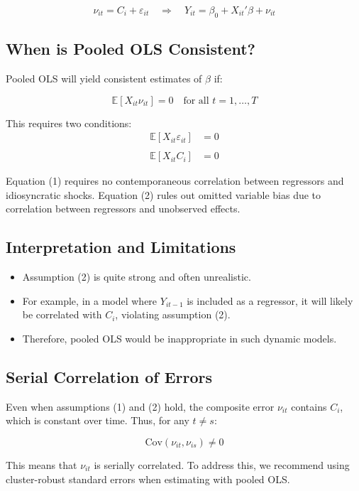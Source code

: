\documentclass[12pt, oneside]{article}
\begin{document}
\[
\nu_{it} = C_i + \varepsilon_{it}
\quad \Rightarrow \quad
Y_{it} = \beta_0 + X_{it}'\beta + \nu_{it}
\]

\subsection*{When is Pooled OLS Consistent?}

Pooled OLS will yield consistent estimates of \( \beta \) if:

\[
\mathbb{E}[X_{it} \nu_{it}] = 0 \quad \text{for all } t = 1, \dots, T
\]

This requires two conditions:
\begin{align}
\mathbb{E}[X_{it} \varepsilon_{it}] &= 0 \tag{1} \\\\
\mathbb{E}[X_{it} C_i] &= 0 \tag{2}
\end{align}

\noindent
Equation (1) requires no contemporaneous correlation between regressors and idiosyncratic shocks. Equation (2) rules out omitted variable bias due to correlation between regressors and unobserved effects.

\subsection*{Interpretation and Limitations}

\begin{itemize}
    \item Assumption (2) is quite strong and often unrealistic.
    \item For example, in a model where \( Y_{it-1} \) is included as a regressor, it will likely be correlated with \( C_i \), violating assumption (2).
    \item Therefore, pooled OLS would be inappropriate in such dynamic models.
\end{itemize}

\subsection*{Serial Correlation of Errors}

Even when assumptions (1) and (2) hold, the composite error \( \nu_{it} \) contains \( C_i \), which is constant over time. Thus, for any \( t \neq s \):

\[
\text{Cov}(\nu_{it}, \nu_{is}) \neq 0
\]

This means that \( \nu_{it} \) is serially correlated. To address this, we recommend using cluster-robust standard errors when estimating with pooled OLS.
\end{document}
